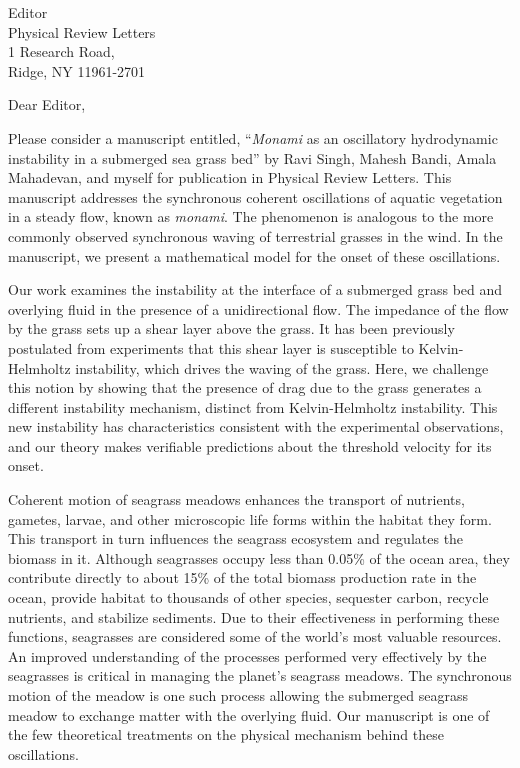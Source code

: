 \documentclass[10pt]{letter}
\date{\today}
\begin{document}
\begin{letter}{
Editor \\
Physical Review Letters \\
1 Research Road, \\
Ridge, NY 11961-2701 
}
\opening{Dear Editor,}

Please consider a manuscript entitled, ``{\it Monami} as an oscillatory hydrodynamic instability in a submerged sea grass bed'' by Ravi Singh, Mahesh Bandi, Amala Mahadevan, and myself for publication in  Physical Review Letters. This manuscript addresses the synchronous coherent oscillations of aquatic vegetation in a steady flow, known as {\it monami}. The phenomenon is analogous to the more commonly observed synchronous waving of terrestrial grasses in the wind. In the manuscript, we present a mathematical model for the onset of these oscillations.

Our work examines the instability at the interface of a submerged grass bed and overlying fluid in the presence of a unidirectional flow.  The impedance of the flow by the grass sets up a shear layer above the grass.   It has been previously postulated from experiments that this shear layer is susceptible to  Kelvin-Helmholtz instability, which drives the waving of the grass.  Here, we challenge this notion by showing that the presence of drag due to the grass generates a different instability mechanism, distinct from Kelvin-Helmholtz instability. This new instability has characteristics consistent with the experimental observations, and our theory makes verifiable predictions about the threshold velocity for its onset.

Coherent motion of seagrass meadows enhances the transport of nutrients, gametes, larvae, and other microscopic life forms within the habitat they form. This transport in turn influences the seagrass ecosystem and regulates the biomass in it. Although seagrasses occupy less than 0.05\% of the ocean area, they contribute directly to about 15\% of the total biomass production rate in the ocean, provide habitat to thousands of other species, sequester carbon, recycle nutrients, and stabilize sediments. Due to their effectiveness in performing these functions, seagrasses are considered some of the world's most valuable resources. An improved understanding of the processes performed very effectively by the seagrasses is critical in managing the planet's seagrass meadows. The synchronous motion of the meadow is one such process allowing the submerged seagrass meadow to exchange matter with the overlying fluid. Our manuscript is one of the few theoretical treatments on the physical mechanism behind these oscillations. 


\end{letter}
\end{document}
